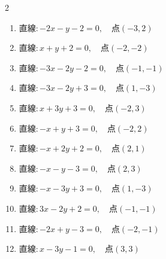 \begin{multicols}{2}
\begin{enumerate}
  \item $直線:-2x-y-2=0,\quad 点 ( -3, 2 )$


  \item $直線:x+y+2=0,\quad 点 ( -2, -2 )$


  \item $直線:-3x-2y-2=0,\quad 点 ( -1, -1 )$


  \item $直線:-3x-2y+3=0,\quad 点 ( 1, -3 )$


\columnbreak %

  \item $直線:x+3y+3=0,\quad 点 ( -2, 3 )$


  \item $直線:-x+y+3=0,\quad 点 ( -2, 2 )$


  \item $直線:-x+2y+2=0,\quad 点 ( 2, 1 )$


  \item $直線:-x-y-3=0,\quad 点 ( 2, 3 )$


  \item $直線:-x-3y+3=0,\quad 点 ( 1, -3 )$


  \item $直線:3x-2y+2=0,\quad 点 ( -1, -1 )$


  \item $直線:-2x+y-3=0,\quad 点 ( -2, -1 )$

        \phantom{$\displaystyle 距離 : 0$}

  \item $直線:x-3y-1=0,\quad 点 ( 3, 3 )$


\end{enumerate}
\end{multicols}
